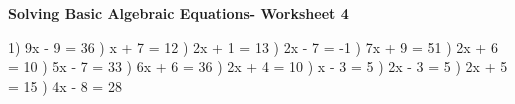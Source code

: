 \documentclass{article}%
\begin{document}
\newline%
\newline%
\newline%
\pagebreak%
\large%
\begin{center}%
\textbf{Solving Basic Algebraic Equations- Worksheet 4}%
\newline%
\newline%
\newline%
\end{center} \normalsize%
1) 9x - 9 = 36%
\newline%
\newline%
) x + 7 = 12%
\newline%
\newline%
) 2x + 1 = 13%
\newline%
\newline%
) 2x - 7 = -1%
\newline%
\newline%
) 7x + 9 = 51%
\newline%
\newline%
) 2x + 6 = 10%
\newline%
\newline%
) 5x - 7 = 33%
\newline%
\newline%
) 6x + 6 = 36%
\newline%
\newline%
) 2x + 4 = 10%
\newline%
\newline%
) x - 3 = 5%
\newline%
\newline%
) 2x - 3 = 5%
\newline%
\newline%
) 2x + 5 = 15%
\newline%
\newline%
) 4x - 8 = 28%
\newline%
\newline%
\end{document}
